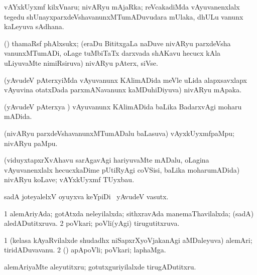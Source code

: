 \bentry
{} 
\gl{\nA}
\expl{}
\bmng
 vAYxkUyxmf kilxVnaru; nivARyu mAjaRka; reVcakadiMda vAyuvanenxlalx tegedu shUnayxparxdeVshavanunxMTumADuvudara mUlaka, dhULu \mo vanunx kaLeyuva sAdhana. 
\emng
\eentry

\bentry
{}
\gl{\nA}
\expl{}
\bmng
 (\birx) thamaRsf phAlxsukx; (eraDu BititxgaLa naDuve nivARyu parxdeVsha vanunxMTumADi, oLage tuMbiTaTx darxvada shAKavu hecucx kAla uLiyuvaMte nimiRsiruva) nivARyu pAterx, siVse. 
\emng
\eentry

\bentry
{} 
\gl{\nA}
\expl{}
\bmng
 (yAvudeV pAterxyiMda vAyuvanunx KAlimADida meVle uLida alapxsavxlapx vAyuvina otatxDada parxmANavanunx kaMDuhiDiyuva) nivARyu mApaka. 
\emng
\eentry

\bentry
{} 
\gl{\gu}
\expl{}
\bmng
 (yAvudeV pAterxya \vi) vAyuvanunx KAlimADida baLika BadarxvAgi moharu mADida. 
\emng
\eentry

\bentry
{}
\gl{\nA}
\expl{}
\bmng
 (nivARyu parxdeVshavanunxMTumADalu baLasuva) vAyxkUyxmfpaMpu; nivARyu paMpu. 
\emng
\eentry

\bentry
{}
\gl{\nA}
\expl{}
\bmng
 (viduyxtapxrXvAhavu sarAgavAgi hariyuvaMte mADalu, oLagina vAyuvanenxlalx hecucxkaDime pUtiRyAgi coVSisi, baLika moharumADida) nivARyu koLave; vAYxkUyxmf TUyxbau. 
\emng
\eentry

\bentry
{}
\gl{\saMkiSx}
\expl{}
\bmng
\emng
\eentry

\bentry
{} 
\gl{\nA}
\expl{}
\bmng
sadA joteyalelxV oyuyxva keYpiDi \mo\ yAvudeV vasutx. 
\emng
\eentry

\bentry
{} 
\gl{\gu}
\expl{}
\bmng
\bnum
\num{1} alemAriyAda; gotAtxda neleyilalxda; sithxravAda manemaThavilalxda; (sadA) aledADutitxruva. 
\num{2} poVkari; poVli(yAgi) tirugutitxruva. 
\enum
\emng
\eentry

\bentry
{} 
\gl{\nA}
\expl{}
\bmng
\bnum
\num{1} (kelasa kAyaRvilalxde shudadhx niSapxrXyoVjakanAgi aMDaleyuva) alemAri; tiridADuvavanu. 
\num{2} (\AmA) apApoVli; poVkari; laphaMga. 
\enum
\emng
\eentry

\bentry
{} 
\gl{\akirx}
\expl{}
\bmng
 alemAriyaMte aleyutitxru; gotutxguriyilalxde tirugADutitxru. 
\emng
\eentry

